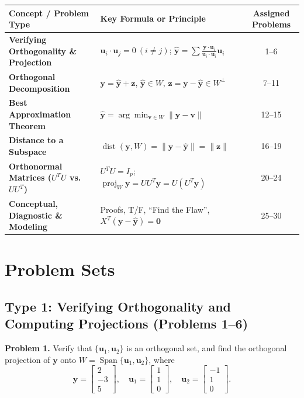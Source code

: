 \documentclass[11pt, letterpaper]{article}
\theoremstyle{definition}
\theoremstyle{remark}
\begin{document}
\renewcommand{\arraystretch}{1.5}
\begin{tabularx}{\textwidth}{>{\bfseries}l X c}
\toprule
Concept / Problem Type & Key Formula or Principle & Assigned Problems \\
\midrule
Verifying Orthogonality \& Projection & $\mathbf{u}_i \cdot \mathbf{u}_j = 0 \ (i \neq j)$; $\hat{\mathbf{y}} = \sum \frac{\mathbf{y}\cdot\mathbf{u}_i}{\mathbf{u}_i\cdot\mathbf{u}_i}\mathbf{u}_i$ & 1--6 \\
Orthogonal Decomposition & $\mathbf{y} = \hat{\mathbf{y}} + \mathbf{z}$, $\hat{\mathbf{y}} \in W$, $\mathbf{z} = \mathbf{y} - \hat{\mathbf{y}} \in W^\perp$ & 7--11 \\
Best Approximation Theorem & $\hat{\mathbf{y}} = \arg\min_{\mathbf{v} \in W} \|\mathbf{y} - \mathbf{v}\|$ & 12--15 \\
Distance to a Subspace & $\operatorname{dist}(\mathbf{y}, W) = \|\mathbf{y} - \hat{\mathbf{y}}\| = \|\mathbf{z}\|$ & 16--19 \\
Orthonormal Matrices ($U^T U$ vs.\ $UU^T$) & $U^T U = I_p$; $\operatorname{proj}_W \mathbf{y} = UU^T \mathbf{y} = U(U^T \mathbf{y})$ & 20--24 \\
Conceptual, Diagnostic \& Modeling & Proofs, T/F, ``Find the Flaw'', $X^T(\mathbf{y} - \hat{\mathbf{y}}) = \mathbf{0}$ & 25--30 \\
\bottomrule
\end{tabularx}

\newpage

\section{Problem Sets}

\subsection{Type 1: Verifying Orthogonality and Computing Projections (Problems 1--6)}

\textbf{Problem 1.} Verify that $\{\mathbf{u}_1, \mathbf{u}_2\}$ is an orthogonal set, and find the orthogonal projection of $\mathbf{y}$ onto $W = \operatorname{Span}\{\mathbf{u}_1, \mathbf{u}_2\}$, where
\[
\mathbf{y} = \begin{bmatrix} 2 \\ -3 \\ 5 \end{bmatrix}, \quad \mathbf{u}_1 = \begin{bmatrix} 1 \\ 1 \\ 0 \end{bmatrix}, \quad \mathbf{u}_2 = \begin{bmatrix} -1 \\ 1 \\ 0 \end{bmatrix}.
\]
\end{document}
